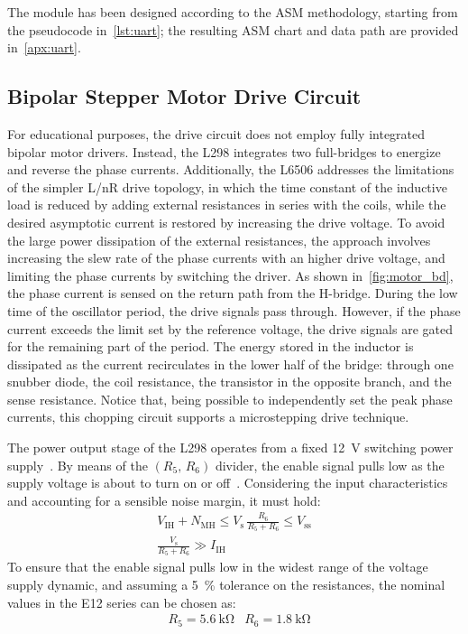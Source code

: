 The module has been designed according to the ASM methodology, starting from the pseudocode in~\cref{lst:uart}; the resulting ASM chart and data path are provided in~\cref{apx:uart}.
 
\subsection{Bipolar Stepper Motor Drive Circuit}\label{subsec:motor_bd}

For educational purposes, the drive circuit does not employ fully integrated bipolar motor drivers. Instead, the L298 integrates two full-bridges to energize and reverse the phase currents. Additionally, the L6506 addresses the limitations of the simpler L/nR drive topology, in which the time constant of the inductive load is reduced by adding external resistances in series with the coils, while the desired asymptotic current is restored by increasing the drive voltage. To avoid the large power dissipation of the external resistances, the approach involves increasing the slew rate of the phase currents with an higher drive voltage, and limiting the phase currents by switching the driver. As shown in~\cref{fig:motor_bd}, the phase current is sensed on the return path from the H-bridge. During the low time of the oscillator period, the drive signals pass through. However, if the phase current exceeds the limit set by the reference voltage, the drive signals are gated for the remaining part of the period. The energy stored in the inductor is dissipated as the current recirculates in the lower half of the bridge: through one snubber diode, the coil resistance, the transistor in the opposite branch, and the sense resistance. Notice that, being possible to independently set the peak phase currents, this chopping circuit supports a microstepping drive technique.

The power output stage of the L298 operates from a fixed \qty{12}{\V} switching power supply~\cite{pwr}. By means of the $(R_5,\,R_6)$ divider, the enable signal pulls low as the supply voltage is about to turn on or off~\cite[9]{l298}. Considering the input characteristics and accounting for a sensible noise margin, it must hold:
\begin{gather*}
    V_\text{IH}+N_\text{MH} \leq V_\text{s}\,\frac{R_6}{R_5+R_6} \leq V_\text{ss} \\
    \frac{V_\text{s}}{R_5+R_6} \gg I_\text{IH}
\end{gather*}
To ensure that the enable signal pulls low in the widest range of the voltage supply dynamic, and assuming a \qty{5}{\percent} tolerance on the resistances, the nominal values in the E12 series can be chosen as:
\begin{align*}
&R_5 = \qty{5.6}{\kohm} &R_6 = \qty{1.8}{\kohm}
\end{align*}

